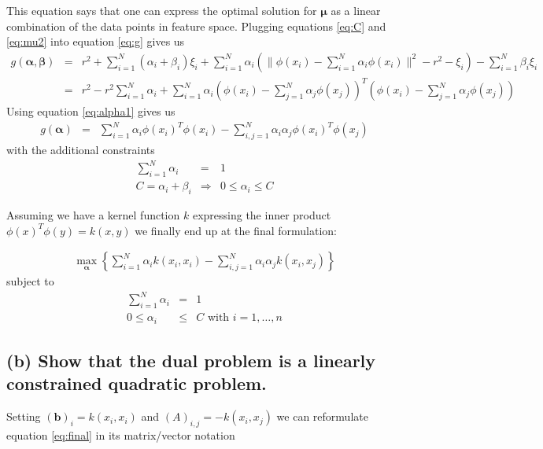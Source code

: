 \documentclass[a4paper, 12pt, titlepage]{article}
\newcommand{\norm}[1]{\lVert#1\rVert}
\begin{document}
This equation says that one can express the optimal solution for $\boldsymbol{\mu}$ as a linear combination of the data points in feature space.
Plugging equations \eqref{eq:C} and \eqref{eq:mu2} into equation \eqref{eq:g} gives us
\begin{eqnarray}
	g(\boldsymbol{\alpha},\boldsymbol{\beta}) &=& r^2 + \sum_{i=1}^N (\alpha_i+\beta_i) \xi_i + \sum_{i=1}^N \alpha_i \left( \norm{\phi(x_i)-\sum_{i=1}^N\alpha_i \phi(x_i)}^2 -r^2 - \xi_i\right) -\sum_{i=1}^N \beta_i \xi_i \nonumber\\
	&=& r^2 -r^2\sum_{i=1}^N\alpha_i + \sum_{i=1}^N\alpha_i \left( \phi(x_i)-\sum_{j=1}^N\alpha_j \phi(x_j) \right)^T \left(\phi(x_i)-\sum_{j=1}^N\alpha_j \phi(x_j)\right) \nonumber
\end{eqnarray}
Using equation \eqref{eq:alpha1} gives us
\begin{eqnarray*}
	g(\boldsymbol{\alpha}) &=& \sum_{i=1}^N \alpha_i \phi(x_i)^T\phi(x_i) - \sum_{i,j=1}^N\alpha_i\alpha_j \phi(x_i)^T\phi(x_j)
\end{eqnarray*}
with the additional constraints
\begin{eqnarray*}
	\sum_{i=1}^N\alpha_i &=&1\\
	C = \alpha_i + \beta_i &\Rightarrow& 0 \le \alpha_i \le C
\end{eqnarray*}

Assuming we have a kernel function $k$ expressing the inner product $\phi(x)^T\phi(y)=k(x,y)$ we finally end up at the final formulation:

\begin{eqnarray}
	\max_{\boldsymbol{\alpha}} \left\{ \sum_{i=1}^N\alpha_ik(x_i,x_i) - \sum_{i,j=1}^N\alpha_i\alpha_jk(x_i,x_j) \right\} \label{eq:final}
\end{eqnarray}
subject to
\begin{eqnarray*}
	\sum_{i=1}^N\alpha_i &=&1\\
	0 \le \alpha_i &\le& C \text{ with } i=1,\ldots,n
\end{eqnarray*}

\subsection*{(b) Show that the dual problem is a linearly constrained quadratic problem.}

Setting $\left(\boldsymbol{b}\right)_i = k(x_i,x_i)$ and $\left(A\right)_{i,j} = -k(x_i,x_j)$ we can reformulate equation \eqref{eq:final} in its matrix/vector notation
\end{document}
